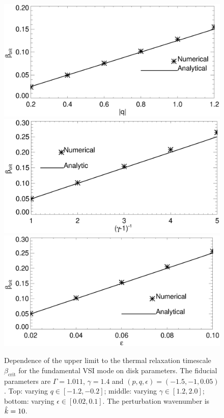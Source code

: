\begin{figure}
  \includegraphics[width=\linewidth,clip=true,trim=0cm 0.cm 0cm
  0cm]{figures/bcrit_compare_q.ps} 
  \includegraphics[width=\linewidth,clip=true,trim=0cm 0.0cm 0cm
  0.8cm]{figures/bcrit_compare_g.ps}
  \includegraphics[width=\linewidth,clip=true,trim=0cm 0.0cm 0cm
  0.8cm]{figures/bcrit_compare_e.ps} 
  \caption{Dependence of the upper limit to the thermal relaxation timescale
    $\beta_\mathrm{crit}$ for the fundamental VSI mode on disk
    parameters. The fiducial parameters are $\Gamma=1.011$,
    $\gamma=1.4$ and $(p,q,\epsilon)=(-1.5,-1,0.05)$. Top: varying
    $q\in[-1.2,-0.2]$; middle: varying $\gamma\in[1.2,2.0]$; bottom:
    varying $\epsilon\in[0.02,0.1]$. The perturbation wavenumber is
    $\hat{k}=10$. 
    \label{bcrit_compare}}  
\end{figure}


